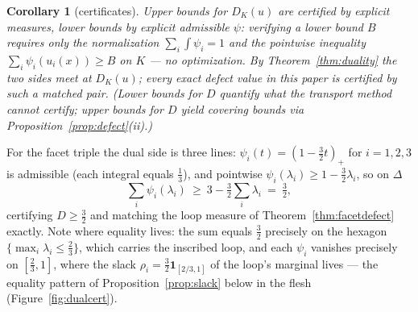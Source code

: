 \documentclass{aims}
\numberwithin{equation}{section}
\theoremstyle{plain}
\newtheorem{corollary}[theorem]{Corollary}
\theoremstyle{definition}
\theoremstyle{remark}
\begin{document}
\begin{corollary}[certificates]\label{cor:certificates}
Upper bounds for $D_K(u)$ are certified by explicit measures, lower bounds by
explicit admissible $\psi$: verifying a lower bound $B$ requires only the
normalization $\sum_i\int\psi_i=1$ and the pointwise inequality
$\sum_i\psi_i(u_i(x))\ge B$ on $K$ --- no optimization. By
Theorem~\ref{thm:duality} the two sides meet at $D_K(u)$; every exact defect
value in this paper is certified by such a matched pair. (Lower bounds for
$D$ quantify what the transport method \emph{cannot} certify; upper bounds
for $D$ yield covering bounds via Proposition~\ref{prop:defect}(ii).)
\end{corollary}

For the facet triple the dual side is three lines:
$\psi_i(t)=(1-\tfrac32t)_+$ for $i=1,2,3$ is admissible (each integral equals
$\tfrac13$), and pointwise $\psi_i(\lambda_i)\ge1-\tfrac32\lambda_i$, so on
$\Delta$
\[
\textstyle\sum_i\psi_i(\lambda_i)\ \ge\ 3-\tfrac32\sum_i\lambda_i\ =\
\tfrac32 ,
\]
certifying $D\ge\tfrac32$ and matching the loop measure of
Theorem~\ref{thm:facetdefect} exactly. Note where equality lives: the sum
equals $\tfrac32$ precisely on the hexagon
$\{\max_i\lambda_i\le\tfrac23\}$, which carries the inscribed loop, and each
$\psi_i$ vanishes precisely on $[\tfrac23,1]$, where the slack
$\rho_i=\tfrac32\mathbf1_{[2/3,1]}$ of the loop's marginal lives --- the
equality pattern of Proposition~\ref{prop:slack} below in the flesh
(Figure~\ref{fig:dualcert}).
\end{document}

